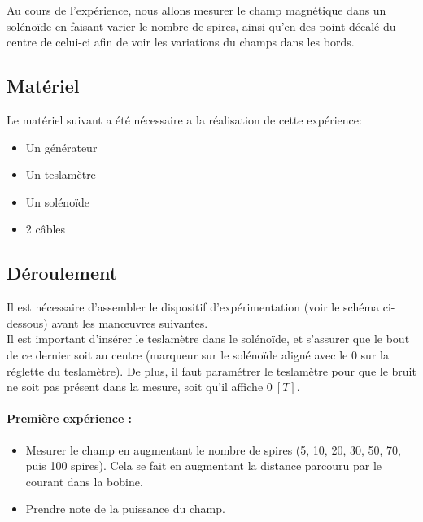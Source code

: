 
Au cours de l'expérience, nous allons mesurer le champ magnétique dans un solénoïde en faisant varier le nombre de spires, ainsi qu'en des point décalé du centre de celui-ci afin de voir les variations du champs dans les bords.

\subsection{Matériel}

Le matériel suivant a été nécessaire a la réalisation de cette expérience:\\
\begin{itemize}
	\item Un générateur
	\item Un teslamètre
	\item Un solénoïde 
	\item 2 câbles
\end{itemize}

\subsection{Déroulement}

Il est nécessaire d'assembler le dispositif d'expérimentation (voir le schéma ci-dessous) avant les manœuvres suivantes.\\
Il est important d'insérer le teslamètre dans le solénoïde, et s'assurer que le bout de ce dernier soit au centre (marqueur sur le solénoïde aligné avec le $0$ sur la réglette du teslamètre). De plus, il faut paramétrer le teslamètre pour que le bruit ne soit pas présent dans la mesure, soit qu'il affiche $0 \ [T]$.\\

\paragraph{Première expérience :}
\begin{itemize}
    \item Mesurer le champ en augmentant le nombre de spires (5, 10, 20, 30, 50, 70, puis 100 spires). Cela se fait en augmentant la distance parcouru par le courant dans la bobine.
    \item Prendre note de la puissance du champ.\\
\end{itemize}

